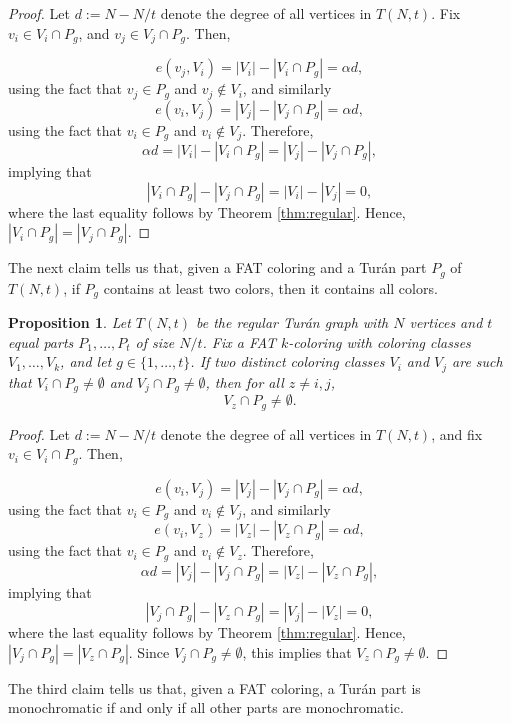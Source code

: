 \documentclass{article}
\theoremstyle{plain}
\newtheorem{proposition}[theorem]{Proposition}
\theoremstyle{definition}
\theoremstyle{remark}
\begin{document}
\begin{proof}

Let $d:=N-N/t$ denote the degree of all vertices in $T(N,t)$. Fix $v_i\in V_i\cap P_g$, and $v_j\in V_j\cap P_g$. Then, 

$$
    e(v_j,V_i)=|V_i|-|V_i \cap P_g|=\alpha d,
    $$ 
   using the fact that $v_j\in P_g$ and $v_j\notin V_i$, and similarly 
    $$
    e(v_i,V_j)=|V_j|-|V_j \cap P_g|=\alpha d,
    $$ 
    using the fact that $v_i\in P_g$ and $v_i\notin V_j$.
    Therefore,
    $$
    \alpha d=|V_i|-|V_i \cap P_g|=|V_j|-|V_j \cap P_g|,
    $$ implying that 
    $$
 |V_i \cap P_g|-|V_j \cap P_g|  = |V_i|- |V_j|  =0,
    $$ where the last equality follows by Theorem \ref{thm:regular}. Hence, $|V_i \cap P_g|=|V_j \cap P_g|$.
\end{proof}

The next claim tells us that, given a FAT coloring and a Turán part $P_g$ of $T(N,t)$, if $P_g$ contains at least two colors, then it contains all colors.

\begin{proposition}\label{claim2:turan}
    Let $T(N,t)$ be the regular Turán graph with $N$ vertices and $t$ equal parts $P_1,\ldots,P_t$ of size $N/t$. Fix a FAT $k$-coloring with coloring classes $V_1,\ldots,V_k$, and let $g\in\{1,\ldots,t\}$. If two distinct coloring classes $V_i$ and $V_j$ are such that $V_i\cap P_g \neq \emptyset$ and $V_j\cap P_g \neq \emptyset$, then for all $z\neq i,j$, 
    $$
    V_z\cap P_g \neq \emptyset.
    $$ 
\end{proposition}


\begin{proof}

Let $d:=N-N/t$ denote the degree of all vertices in $T(N,t)$, and fix $v_i\in V_i\cap P_g$. Then, 

$$
    e(v_i,V_j)=|V_j|-|V_j \cap P_g|=\alpha d,
    $$ using the fact that $v_i\in P_g$ and $v_i\notin V_j$, and similarly
    $$
    e(v_i,V_z)=|V_z|-|V_z \cap P_g|=\alpha d,
    $$ using the fact that $v_i\in P_g$ and $v_i\notin V_z$.   Therefore,
    $$
    \alpha d=|V_j|-|V_j \cap P_g|=|V_z|-|V_z \cap P_g|,
    $$ implying that 
    $$
 |V_j \cap P_g|-|V_z \cap P_g|  = |V_j|- |V_z|  =0,
    $$ where the last equality follows by Theorem \ref{thm:regular}. Hence, $|V_j \cap P_g|=|V_z \cap P_g|$. Since $V_j\cap P_g \neq \emptyset$, this implies that $V_z\cap P_g \neq \emptyset$.
\end{proof}

The third claim tells us that, given a FAT coloring, a Turán part is monochromatic if and only if all other parts are monochromatic.
\end{document}
